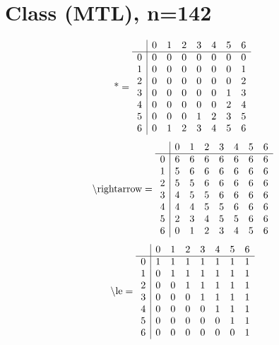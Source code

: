 \documentclass[11pt]{article}
\begin{document}
\section{Class (MTL), n=142}
\[\text{*} = 
\begin{array}{r | r r r r r r r}
 & 0 & 1 & 2 & 3 & 4 & 5 & 6 \\ \hline
0 & 0 & 0 & 0 & 0 & 0 & 0 & 0 \\
1 & 0 & 0 & 0 & 0 & 0 & 0 & 1 \\
2 & 0 & 0 & 0 & 0 & 0 & 0 & 2 \\
3 & 0 & 0 & 0 & 0 & 0 & 1 & 3 \\
4 & 0 & 0 & 0 & 0 & 0 & 2 & 4 \\
5 & 0 & 0 & 0 & 1 & 2 & 3 & 5 \\
6 & 0 & 1 & 2 & 3 & 4 & 5 & 6 \\
\end{array}
\]
\[\text{\textbackslash rightarrow} = 
\begin{array}{r | r r r r r r r}
 & 0 & 1 & 2 & 3 & 4 & 5 & 6 \\ \hline
0 & 6 & 6 & 6 & 6 & 6 & 6 & 6 \\
1 & 5 & 6 & 6 & 6 & 6 & 6 & 6 \\
2 & 5 & 5 & 6 & 6 & 6 & 6 & 6 \\
3 & 4 & 5 & 5 & 6 & 6 & 6 & 6 \\
4 & 4 & 4 & 5 & 5 & 6 & 6 & 6 \\
5 & 2 & 3 & 4 & 5 & 5 & 6 & 6 \\
6 & 0 & 1 & 2 & 3 & 4 & 5 & 6 \\
\end{array}
\]
\[\text{\textbackslash le} = 
\begin{array}{r | r r r r r r r}
 & 0 & 1 & 2 & 3 & 4 & 5 & 6 \\ \hline
0 & 1 & 1 & 1 & 1 & 1 & 1 & 1 \\
1 & 0 & 1 & 1 & 1 & 1 & 1 & 1 \\
2 & 0 & 0 & 1 & 1 & 1 & 1 & 1 \\
3 & 0 & 0 & 0 & 1 & 1 & 1 & 1 \\
4 & 0 & 0 & 0 & 0 & 1 & 1 & 1 \\
5 & 0 & 0 & 0 & 0 & 0 & 1 & 1 \\
6 & 0 & 0 & 0 & 0 & 0 & 0 & 1 \\
\end{array}
\]
\end{document}
